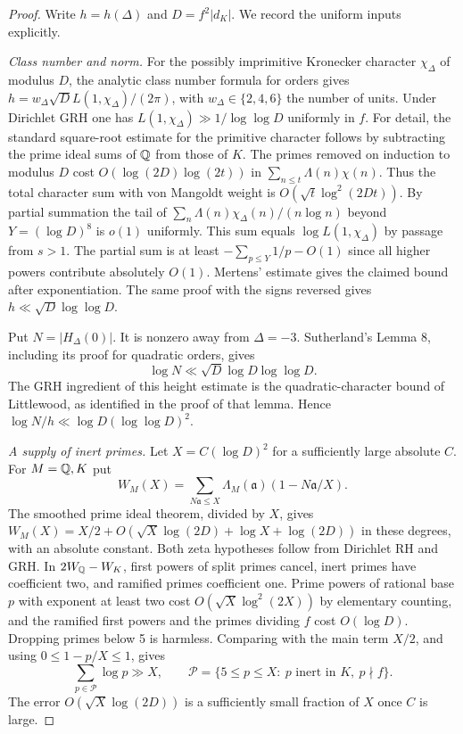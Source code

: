 \begin{proof}
Write $h=h(\Delta)$ and $D=f^2|d_K|$. We record the uniform inputs explicitly.

\emph{Class number and norm.}
For the possibly imprimitive Kronecker character $\chi_\Delta$ of modulus $D$, the analytic class number formula for orders gives
$h=w_\Delta\sqrt D L(1,\chi_\Delta)/(2\pi)$, with $w_\Delta\in\{2,4,6\}$ the number of units. Under Dirichlet GRH one has $L(1,\chi_\Delta)\gg1/\log\log D$ uniformly in $f$. For detail, the standard square-root estimate for the primitive character follows by subtracting the prime ideal sums of $\mathbb Q$ from those of $K$. The primes removed on induction to modulus $D$ cost $O(\log(2D)\log(2t))$ in $\sum_{n\le t}\Lambda(n)\chi(n)$. Thus the total character sum with von Mangoldt weight is $O(\sqrt t\log^2(2Dt))$. By partial summation the tail of $\sum_{n}\Lambda(n)\chi_\Delta(n)/(n\log n)$ beyond $Y=(\log D)^8$ is $o(1)$ uniformly. This sum equals $\log L(1,\chi_\Delta)$ by passage from $s>1$. The partial sum is at least $-\sum_{p\le Y}1/p-O(1)$ since all higher powers contribute absolutely $O(1)$. Mertens' estimate gives the claimed bound after exponentiation. The same proof with the signs reversed gives $h\ll\sqrt D\log\log D$.

Put $N=|H_\Delta(0)|$. It is nonzero away from $\Delta=-3$. Sutherland's Lemma 8, including its proof for quadratic orders, gives
\[
 \log N\ll\sqrt D\log D\log\log D .
\]
The GRH ingredient of this height estimate is the quadratic-character bound of Littlewood, as identified in the proof of that lemma. Hence $\log N/h\ll\log D(\log\log D)^2$.\cite{suth,gm}

\emph{A supply of inert primes.}
Let $X=C(\log D)^2$ for a sufficiently large absolute $C$. For $M=\mathbb Q,K$ put
\[
 W_M(X)=\sum_{N\mathfrak a\le X}\Lambda_M(\mathfrak a)(1-N\mathfrak a/X).
\]
The smoothed prime ideal theorem, divided by $X$, gives
$W_M(X)=X/2+O(\sqrt X\log(2D)+\log X+\log(2D))$
in these degrees, with an absolute constant. Both zeta hypotheses follow from Dirichlet RH and GRH. In $2W_{\mathbb Q}-W_K$, first powers of split primes cancel, inert primes have coefficient two, and ramified primes coefficient one. Prime powers of rational base $p$ with exponent at least two cost $O(\sqrt X\log^2(2X))$ by elementary counting, and the ramified first powers and the primes dividing $f$ cost $O(\log D)$. Dropping primes below 5 is harmless. Comparing with the main term $X/2$, and using $0\le1-p/X\le1$, gives
\[
 \sum_{p\in\mathcal P}\log p\gg X,\qquad
 \mathcal P=\{5\le p\le X:\ p\text{ inert in }K,\ p\nmid f\}.
\]
The error $O(\sqrt X\log(2D))$ is a sufficiently small fraction of $X$ once $C$ is large.\cite{gms}


\end{proof}
